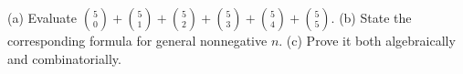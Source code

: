 (a) Evaluate $\binom50+\binom51+\binom52+\binom53+\binom54+\binom55$. (b) State the corresponding formula for general nonnegative $n$. (c) Prove it both algebraically and combinatorially.
